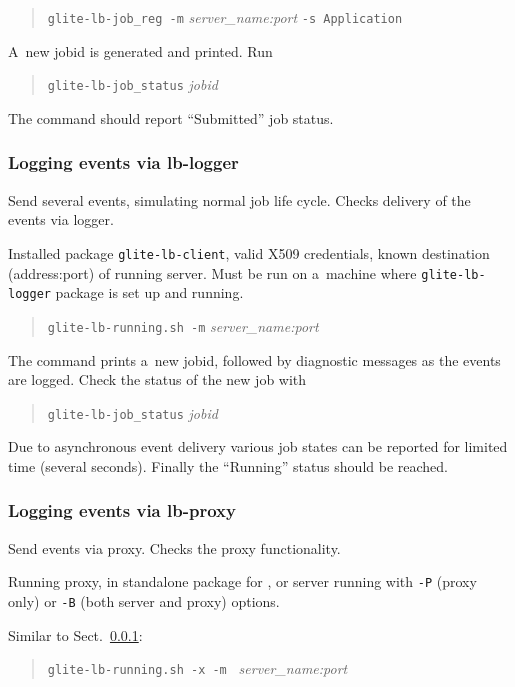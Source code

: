 \how 
\begin{quote}
\texttt{glite-lb-job\_reg -m} \emph{server\_name:port} \texttt{-s Application}
\end{quote}
A~new jobid is generated and printed.  Run 
\begin{quote}
\verb'glite-lb-job_status' \emph{jobid}
\end{quote}

\result
The command should report ``Submitted'' job status.

\subsubsection{Logging events via lb-logger}

\label{smoke-log}

Send several \LB events, simulating normal job life cycle.
Checks delivery of the events via \LB logger.

\req Installed package \texttt{glite-lb-client}, valid X509 credentials,
known destination (address:port) of running \LB server.
Must be run on a~machine where \texttt{glite-lb-logger} package is set up and running.\footnotemark[\theexamplesfootnote]

\how
\begin{quote}
\texttt{glite-lb-running.sh -m} \emph{server\_name:port}
\end{quote}

The command prints a~new jobid, followed by diagnostic messages as the events are logged. 
Check the status of the new job with
\begin{quote}
\verb'glite-lb-job_status' \emph{jobid}
\end{quote}

\result
Due to asynchronous event
delivery various job states can be reported for limited time (several seconds).
Finally the
``Running'' status should be reached.

\subsubsection{Logging events via lb-proxy}

Send events via \LB proxy. Checks the proxy functionality.

\req Running \LB proxy, in standalone package for , or
\LB server running with \verb'-P' (proxy only) or \verb'-B' (both server and proxy)
options.\footnotemark[\theexamplesfootnote]

\how Similar to Sect.~\ref{smoke-log}:
\begin{quote}
\verb'glite-lb-running.sh -x -m ' \emph{server\_name:port}
\end{quote}

